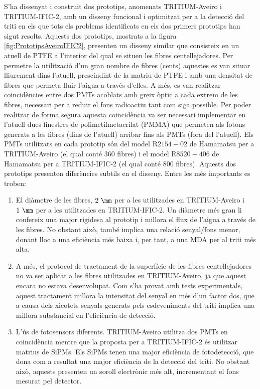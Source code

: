 S'ha dissenyat i construit dos prototips, anomenats TRITIUM-Aveiro i TRITIUM-IFIC-2, amb un disseny funcional i optimitzat per a la detecció del triti en els que tots els problems identificats en els dos primers prototips han sigut resolts. Aquests dos prototips, mostrats a la figura \ref{fig:PrototipsAveiroIFIC2}, presenten un disseny similar que consisteix en un atuell de PTFE a l'interior del qual se situen les fibres centellejadores. Per permetre la utilització d'un gran nombre de fibres (cents) aquestes es van situar lliurement dins l'atuell, prescindint de la matriu de PTFE i amb una densitat de fibres que permeta fluir l'aigua a través d'elles. A més, es van realitzar coincidències entre dos PMTs acoblats amb greix òptic a cada extrem de les fibres, necessari per a reduir el fons radioactiu tant com siga possible. Per poder realitzar de forma segura aquesta coincidència va ser necessari implementar en l'atuell dues finestres de polimetilmetacrilat (PMMA) que permeten als fotons generats a les fibres (dins de l'atuell) arribar fins als PMTs (fora del l'atuell). Els PMTs utilitzats en cada prototip són del model R$2154-02$ de Hamamatsu \cite{DataSheetPMTsAveiro} per a TRITIUM-Aveiro (el qual conté 360 fibres) i el model R$8520-406$ de Hamamatsu \cite{DataSheetPMTs} per a TRITIUM-IFIC-2 (el qual conté 800 fibres). Aquests dos prototips presenten diferències subtils en el disseny. Entre les més importants es troben:
\begin{enumerate}
\item{} El diàmetre de les fibres, $2~\mm$ per a les utilitzades en TRITIUM-Aveiro i $1~\mm$ per a les utilitzades en TRITIUM-IFIC-2. Un diàmetre més gran li confereix una major rigidesa al prototip i millora el flux de l'aigua a través de les fibres. No obstant això, també implica una relació senyal/fons menor, donant lloc a una eficiència més baixa i, per tant, a una MDA per al triti més alta.
\item{} A més, el protocol de tractament de la superfície de les fibres centellejadores no va ser aplicat a les fibres utilitzades en TRITIUM-Aveiro, ja que aquest encara no estava desenvolupat. Com s'ha provat amb tests experimentals, aquest tractament millora la intensitat del senyal en més d'un factor dos, que a causa dels xicotets senyals generats pels esdeveniments del triti implica una millora substancial en l'eficiència de detecció.
\item{} L'ús de fotosensors diferents. TRITIUM-Aveiro utilitza dos PMTs en coincidència mentre que la proposta per a TRITIUM-IFIC-2 és utilitzar matrius de SiPMs. Els SiPMs tenen una major eficiència de fotodetecció, que dona com a resultat una major eficiència de la detecció del triti. No obstant això, aquests presenten un soroll electrònic més alt, incrementant el fons mesurat pel detector. %
\end{enumerate} 
